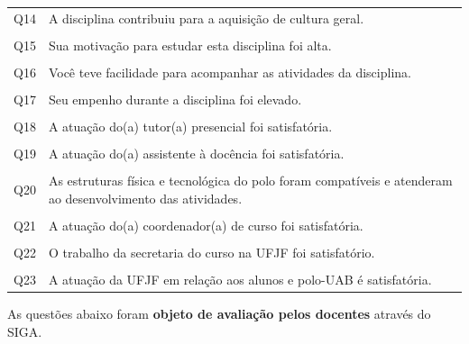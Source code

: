 \documentclass[a4paper,10pt]{article}
\begin{document}
{\begin{center}
\begin{tabularx}{\linewidth}{l|X}
Q14&A disciplina contribuiu para a aquisição de cultura geral.\\\\
Q15&Sua motivação para estudar esta disciplina foi alta.\\\\
Q16&Você teve facilidade para acompanhar as atividades da disciplina.\\\\
Q17&Seu empenho durante a disciplina foi elevado.\\\\
Q18&A atuação do(a) tutor(a) presencial foi satisfatória.\\\\
Q19&A atuação do(a) assistente à docência foi satisfatória.\\\\
Q20&As estruturas física e tecnológica do polo foram compatíveis e atenderam ao desenvolvimento das atividades.\\\\
Q21&A atuação do(a) coordenador(a) de curso foi satisfatória.\\\\
Q22&O trabalho da secretaria do curso na UFJF foi satisfatório.\\\\
Q23&A atuação da UFJF em relação aos alunos e polo-UAB é satisfatória.
\end{tabularx}
\end{center}
}
As questões abaixo foram {\bf objeto de avaliação pelos docentes} através do SIGA.
\end{document}
